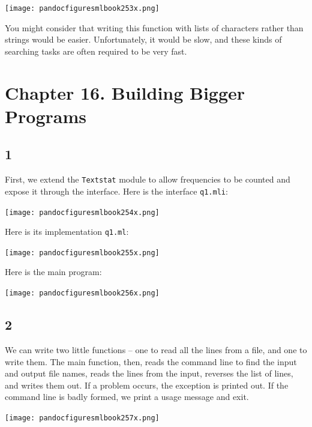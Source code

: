 \documentclass[]{book}
\begin{document}
\medskip
\begin{center}
\noindent\texttt{[image: pandocfiguresmlbook253x.png]}
\end{center}
\medskip

\noindent You might consider that writing this function with lists of characters rather than strings would be easier. Unfortunately, it would be slow, and these kinds of searching tasks are often required to be very fast.

\section*{Chapter 16. Building Bigger Programs}
\subsection*{1}
First, we extend the \texttt{Textstat} module to allow frequencies to be counted and expose it through the interface. Here is the interface \texttt{q1.mli}:

\medskip
\begin{center}
\noindent\texttt{[image: pandocfiguresmlbook254x.png]}
\end{center}
\medskip

\noindent Here is its implementation \texttt{q1.ml}:

\medskip
\begin{center}
\noindent\texttt{[image: pandocfiguresmlbook255x.png]}
\end{center}
\medskip

\noindent Here is the main program:

\medskip
\begin{center}
\noindent\texttt{[image: pandocfiguresmlbook256x.png]}
\end{center}
\medskip

\subsection*{2}

We can write two little functions -- one to read all the lines from a file, and one to write them. The main function, then, reads the command line to find the input and output file names, reads the lines from the input, reverses the list of lines, and writes them out. If a problem occurs, the exception is printed out. If the command line is badly formed, we print a usage message and exit.

\medskip
\begin{center}
\noindent\texttt{[image: pandocfiguresmlbook257x.png]}
\end{center}
\medskip
\end{document}
